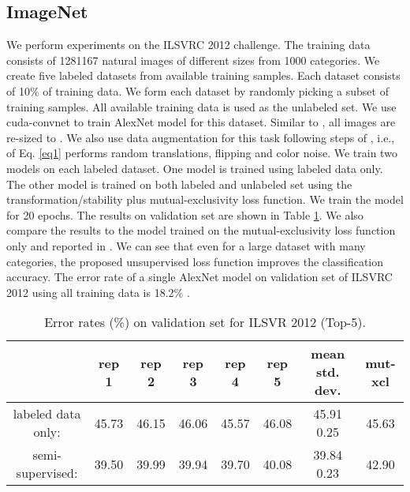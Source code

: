 \documentclass{article}
\begin{document}
\subsection{ImageNet}
\vspace{-0.1cm}
We perform experiments on the ILSVRC 2012 challenge. The training data consists of 1281167 natural images of different sizes from 1000 categories. We create five labeled datasets from available training samples. Each dataset consists of 10\% of training data. We form each dataset by randomly picking a subset of training samples. All available training data is used as the unlabeled set. We use cuda-convnet to train AlexNet model \cite{krizhevsky2012imagenet} for this dataset. Similar to \cite{krizhevsky2012imagenet}, all images are re-sized to . We also use data augmentation for this task following steps of \cite{krizhevsky2012imagenet}, i.e.,  of Eq. \ref{eq1} performs random translations, flipping and color noise. We train two models on each labeled dataset. One model is trained using labeled data only. The other model is trained on both labeled and unlabeled set using the transformation/stability plus mutual-exclusivity loss function. We train the model for 20 epochs. The results on validation set are shown in Table \ref{tab2}. We also compare the results to the model trained on the mutual-exclusivity loss function only and reported in \cite{mutualexclusive}. We can see that even for a large dataset with many categories, the proposed unsupervised loss function improves the classification accuracy. The error rate of a single AlexNet model on validation set of ILSVRC 2012 using all training data is 18.2\% \cite{krizhevsky2012imagenet}.
\begin{table}[h]
  \caption{Error rates (\%) on validation set for ILSVR 2012 (Top-5).}
  \begin{center}
  \vspace{-0.5cm}
  \begin{tabular}{ c  c  c  c  c  c  c  c }
 \rule[-1.2ex]{0pt}{0ex}		         &  rep 1  &  rep 2  &   rep 3  & rep 4  &  rep 5 &  mean  std. dev. & mut-xcl \cite{mutualexclusive} \\ \hline     
 \rule{0pt}{3ex}     labeled data only:  &  45.73  &  46.15  &   46.06  & 45.57  &  46.08 &  45.91  0.25                    & 45.63 \\
                      semi-supervised:   &  39.50  &  39.99  &   39.94  & 39.70  &  40.08 &  39.84  0.23                     & 42.90               
  \end{tabular}  
  \end{center}
  \label{tab2}
\end{table}
\vspace{-0.6cm}
\end{document}

